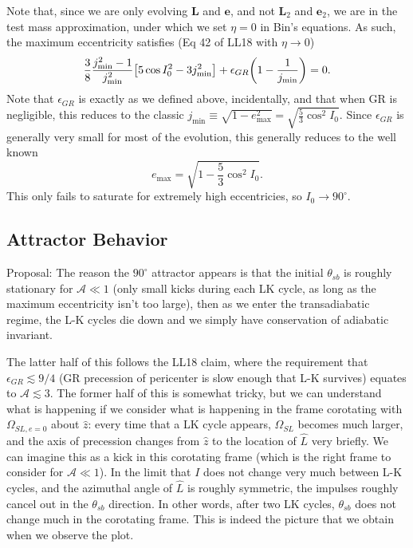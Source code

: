 \documentclass[11pt,
        usenames, %
        dvipsnames %
    ]{article}
\newcommand*{\bm}[1]{\boldsymbol{\mathbf{#1}}}
\DeclarePairedDelimiter\p{\lparen}{\rparen}
\DeclarePairedDelimiter\s{\lbrack}{\rbrack}
\begin{document}
Note that, since we are only evolving $\bm{L}$ and $\bm{e}$, and not $\bm{L}_2$
and $\bm{e}_2$, we are in the test mass approximation, under which we set $\eta
= 0$ in Bin's equations. As such, the maximum eccentricity satisfies (Eq 42 of
LL18 with $\eta \to 0$)
\begin{equation}
    \frac{3}{8}\frac{j_{\min}^2 - 1}{j_{\min}^2}\s*{
        5\cos I_0^2 - 3j_{\min}^2} + \epsilon_{GR}\p*{1 - \frac{1}{j_{\min}}} =
        0.
\end{equation}
Note that $\epsilon_{GR}$ is exactly as we defined above, incidentally, and that
when GR is negligible, this reduces to the classic $j_{\min} \equiv \sqrt{1 -
e_{\max}^2} = \sqrt{\frac{5}{3}\cos^2 I_0}$. Since $\epsilon_{GR}$ is generally
very small for most of the evolution, this generally reduces to the well known
\begin{equation}
    e_{\max} = \sqrt{1 - \frac{5}{3}\cos^2I_0}.
\end{equation}
This only fails to saturate for extremely high eccentricies, so $I_0 \to
90^\circ$.

\subsection{Attractor Behavior}

Proposal: The reason the $90^\circ$ attractor appears is that the initial
$\theta_{sb}$ is roughly stationary for $\mathcal{A} \ll 1$ (only small kicks
during each LK cycle, as long as the maximum eccentricity isn't too large), then
as we enter the transadiabatic regime, the L-K cycles die down and we simply
have conservation of adiabatic invariant.

The latter half of this follows the LL18 claim, where the requirement that
$\epsilon_{GR} \lesssim 9/4$ (GR precession of pericenter is slow enough that
L-K survives) equates to $\mathcal{A} \lesssim 3$. The former half of this is
somewhat tricky, but we can understand what is happening if we consider what is
happening in the frame corotating with $\Omega_{SL, e = 0}$ about $\hat{z}$:
every time that a LK cycle appears, $\Omega_{SL}$ becomes much larger, and the
axis of precession changes from $\hat{z}$ to the location of $\hat{L}$ very
briefly. We can imagine this as a kick in this corotating frame (which is the
right frame to consider for $\mathcal{A} \ll 1$). In the limit that $I$ does not
change very much between L-K cycles, and the azimuthal angle of $\hat{L}$ is
roughly symmetric, the impulses roughly cancel out in the $\theta_{sb}$
direction. In other words, after two LK cycles, $\theta_{sb}$ does not change
much in the corotating frame. This is indeed the picture that we obtain when we
observe the plot.
\end{document}
